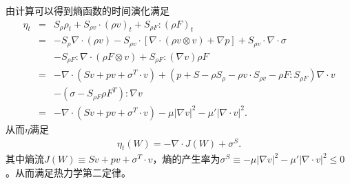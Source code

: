 由计算可以得到熵函数的时间演化满足
\begin{eqnarray}\label{eq:entropy}
  \eta_t  &=& S_\rho \rho_t + S_{\rho  v } \cdot (\rho  v )_t  + S_{\rho F} : (\rho F)_t \nonumber \\
  &=& -S_{\rho} \nabla \cdot (\rho  v )  - S_{\rho  v  } \cdot [\nabla \cdot (\rho  v \otimes v ) + \nabla p] + S_{\rho  v } \cdot \nabla \cdot \sigma \nonumber \\
    &&- S_{\rho F} : \nabla \cdot (\rho F\otimes  v  ) + S_{\rho F}:(\nabla   v ) \rho F \nonumber \\
    &=& - \nabla \cdot (S  v +p  v  +\sigma^T \cdot v ) + (p+S - \rho S_\rho - \rho  v  \cdot S_{\rho  v } - \rho F : S_{\rho F}) \nabla \cdot  v  \nonumber \\
    &&- (\sigma - S_{\rho F} \rho F^T) : \nabla  v \nonumber \\
    &=& - \nabla \cdot (S  v +p  v  +\sigma^T \cdot v ) - \mu|\nabla  v |^2 - \mu'|\nabla\cdot v |^2.
\end{eqnarray}
从而$\eta$满足
\begin{eqnarray}\label{eq:entropyvol}
  \eta_t(W) = -\nabla\cdot J(W) + \sigma^S.
\end{eqnarray}
其中熵流$J(W)\equiv S  v +p  v  +\sigma^T \cdot v $，熵的产生率为$\sigma^S \equiv - \mu|\nabla  v |^2 - \mu'|\nabla\cdot v |^2 \le 0$。从而满足热力学第二定律。

